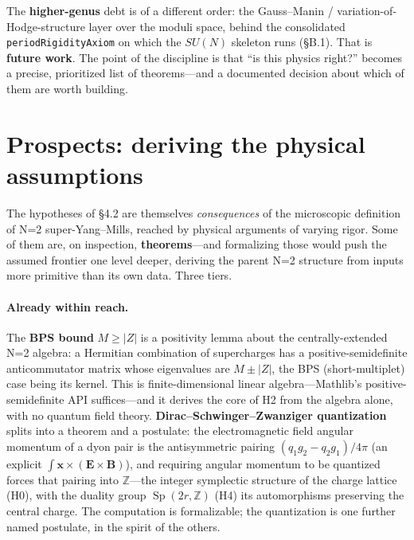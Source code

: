 \documentclass{article}
\theoremstyle{plain}
\theoremstyle{definition}
\numberwithin{equation}{section}
\newcommand{\Z}{\mathbb{Z}}
\newcommand{\Sp}{\operatorname{Sp}}
\newcommand{\code}[1]{\texttt{#1}}
\begin{document}
\medskip
\noindent The \textbf{higher-genus} debt is of a different order: the Gauss--Manin /
variation-of-Hodge-structure layer over the moduli space, behind the consolidated
\code{periodRigidityAxiom} on which the $SU(N)$ skeleton runs (\S B.1). That is \textbf{future
work}. The point of the discipline is that ``is this physics right?'' becomes a precise,
prioritized list of theorems---and a documented decision about which of them are worth
building.

\section{Prospects: deriving the physical assumptions}

The hypotheses of \S4.2 are themselves \emph{consequences} of the microscopic definition of N=2
super-Yang--Mills, reached by physical arguments of varying rigor. Some of them are, on inspection,
\textbf{theorems}---and formalizing those would push the assumed frontier one level deeper, deriving
the parent N=2 structure from inputs more primitive than its own data. Three tiers.

\paragraph{Already within reach.} The \textbf{BPS bound} $M \ge |Z|$ is a positivity lemma about the
centrally-extended N=2 algebra: a Hermitian combination of supercharges has a positive-semidefinite
anticommutator matrix whose eigenvalues are $M \pm |Z|$, the BPS (short-multiplet) case being its
kernel. This is finite-dimensional linear algebra---Mathlib's positive-semidefinite API
suffices---and it derives the core of H2 from the algebra alone, with no quantum field theory.
\textbf{Dirac--Schwinger--Zwanziger quantization} splits into a theorem and a postulate: the
electromagnetic field angular momentum of a dyon pair is the antisymmetric pairing
$(q_1 g_2 - q_2 g_1)/4\pi$ (an explicit $\int \mathbf{x}\times(\mathbf{E}\times\mathbf{B})$), and
requiring angular momentum to be quantized forces that pairing into $\Z$---the integer symplectic
structure of the charge lattice (H0), with the duality group $\Sp(2r,\Z)$ (H4) its automorphisms
preserving the central charge. The computation is formalizable; the quantization is one further
named postulate, in the spirit of the others.
\end{document}
